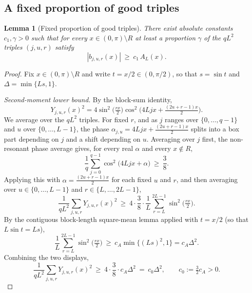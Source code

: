 \documentclass[11pt,reqno]{amsart}
\theoremstyle{plain}
\newtheorem{lemma}{Lemma}
\theoremstyle{definition}
\theoremstyle{remark}
\begin{document}
\subsection{A fixed proportion of good triples}

\begin{lemma}[Fixed proportion of good triples]\label{lem:good-triples}
There exist absolute constants $c_1,\gamma>0$ such that for every $x\in(0,\pi)\setminus R$ at least a proportion $\gamma$ of the $qL^2$ triples $(j,u,r)$ satisfy
\[
|b_{j,u,r}(x)|\ \ge\ c_1\,A_L(x).
\]
\end{lemma}

\begin{proof}
Fix $x\in(0,\pi)\setminus R$ and write $t=x/2\in(0,\pi/2)$, so that $s=\sin t$ and $\Delta=\min\{Ls,1\}$.

\emph{Second-moment lower bound.} By the block-sum identity,
\[
Y_{j,u,r}(x)^2=4\sin^2\!\Big(\tfrac{rx}{2}\Big)\cos^2\!\Big(4Ljx+\tfrac{(2u+r-1)x}{2}\Big).
\]
We average over the $qL^2$ triples. For fixed $r$, and as $j$ ranges over $\{0,\dots,q-1\}$ and $u$ over $\{0,\dots,L-1\}$, the phase $\alpha_{j,u}=4Ljx+\tfrac{(2u+r-1)x}{2}$ splits into a box part depending on $j$ and a shift depending on $u$. Averaging over $j$ first, the non-resonant phase average gives, for every real $\alpha$ and every $x\notin R$,
\[
\frac1q\sum_{j=0}^{q-1}\cos^2\!\big(4Ljx+\alpha\big)\ \ge\ \frac38 .
\]
Applying this with $\alpha=\tfrac{(2u+r-1)x}{2}$ for each fixed $u$ and $r$, and then averaging over $u\in\{0,\dots,L-1\}$ and $r\in\{L,\dots,2L-1\}$,
\[
\frac{1}{qL^2}\sum_{j,u,r}Y_{j,u,r}(x)^2
\ \ge\ 4\cdot\frac38\cdot\frac1L\sum_{r=L}^{2L-1}\sin^2\!\Big(\tfrac{rx}{2}\Big).
\]
By the contiguous block-length square-mean lemma applied with $t=x/2$ (so that $L\sin t=Ls$),
\[
\frac1L\sum_{r=L}^{2L-1}\sin^2\!\Big(\tfrac{rx}{2}\Big)\ \ge\ c_A\min\{(Ls)^2,1\}=c_A\Delta^2 .
\]
Combining the two displays,
\begin{equation}\label{eq:secondmoment}
\frac{1}{qL^2}\sum_{j,u,r}Y_{j,u,r}(x)^2\ \ge\ 4\cdot\frac38\cdot c_A\Delta^2\ =\ c_0\Delta^2,
\qquad c_0:=\tfrac32 c_A>0 .
\end{equation}


\end{proof}
\end{document}
